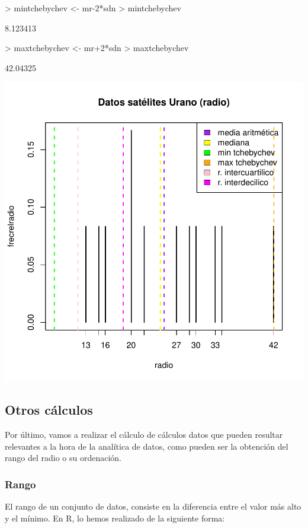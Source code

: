 \documentclass [a4paper] {article}
\begin{document}
\begin{Schunk}
\begin{Sinput}
> mintchebychev <- mr-2*sdn
> mintchebychev
\end{Sinput}
\begin{Soutput}
[1] 8.123413
\end{Soutput}
\begin{Sinput}
> maxtchebychev <- mr+2*sdn
> maxtchebychev
\end{Sinput}
\begin{Soutput}
[1] 42.04325
\end{Soutput}
\end{Schunk}
\includegraphics{Grupo.1-PL1-Figura 1}


\subsection{Otros cálculos}
Por último, vamos a realizar el cálculo de cálculos datos que pueden resultar relevantes a la hora 
de la analítica de datos, como pueden ser la obtención del rango del radio o su ordenación.

\subsubsection{Rango}
El rango de un conjunto de datos, consiste en la diferencia entre el valor más alto y el mínimo.
En R, lo hemos realizado de la siguiente forma:
\end{document}
